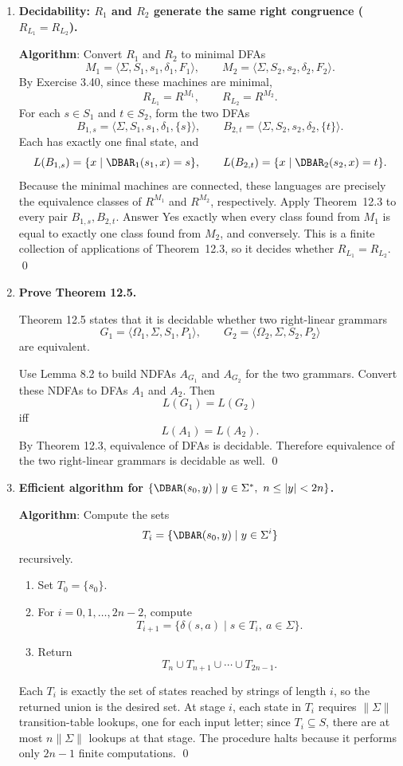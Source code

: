 \begin{enumerate}[{12.}1. ]
\item \textbf{Decidability: $R_1$ and $R_2$ generate the same right congruence ($R_{L_1}=R_{L_2}$).}

\textbf{Algorithm}: Convert $R_1$ and $R_2$ to minimal DFAs
\[
M_1=\langle\Sigma,S_1,s_1,\delta_1,F_1\rangle,\qquad
M_2=\langle\Sigma,S_2,s_2,\delta_2,F_2\rangle.
\]
By Exercise 3.40, since these machines are minimal,
\[
R_{L_1}=R^{M_1},\qquad R_{L_2}=R^{M_2}.
\]
For each $s\in S_1$ and $t\in S_2$, form the two DFAs
\[
B_{1,s}=\langle\Sigma,S_1,s_1,\delta_1,\{s\}\rangle,
\qquad
B_{2,t}=\langle\Sigma,S_2,s_2,\delta_2,\{t\}\rangle.
\]
Each has exactly one final state, and
\[
L(B_{1,s})=\{x\mid\DBAR_1(s_1,x)=s\},
\qquad
L(B_{2,t})=\{x\mid\DBAR_2(s_2,x)=t\}.
\]
Because the minimal machines are connected, these languages are precisely the
equivalence classes of $R^{M_1}$ and $R^{M_2}$, respectively. Apply
Theorem~12.3 to every pair $B_{1,s},B_{2,t}$. Answer Yes exactly when
every class found from $M_1$ is equal to exactly one class found from $M_2$, and
conversely. This is a finite collection of applications of Theorem~12.3, so it
decides whether $R_{L_1}=R_{L_2}$. \qed

\item \textbf{Prove Theorem 12.5.}

Theorem 12.5 states that it is decidable whether two right-linear grammars
\[
G_1=\langle\Omega_1,\Sigma,S_1,P_1\rangle,\qquad
G_2=\langle\Omega_2,\Sigma,S_2,P_2\rangle
\]
are equivalent.

Use Lemma 8.2 to build NDFAs $A_{G_1}$ and $A_{G_2}$ for the two grammars.
Convert these NDFAs to DFAs $A_1$ and $A_2$. Then
\[
L(G_1)=L(G_2)
\]
iff
\[
L(A_1)=L(A_2).
\]
By Theorem 12.3, equivalence of DFAs is decidable. Therefore equivalence of the
two right-linear grammars is decidable as well. \qed

\item \textbf{Efficient algorithm for $\{\DBAR(s_0,y)\mid y\in\Sigma^*,\ n\leq|y|<2n\}$.}

\textbf{Algorithm}: Compute the sets
\[
T_i=\{\DBAR(s_0,y)\mid y\in\Sigma^i\}
\]
recursively.
\begin{enumerate}
\item Set $T_0=\{s_0\}$.
\item For $i=0,1,\ldots,2n-2$, compute
\[
T_{i+1}=\{\delta(s,a)\mid s\in T_i,\ a\in\Sigma\}.
\]
\item Return
\[
T_n\cup T_{n+1}\cup\cdots\cup T_{2n-1}.
\]
\end{enumerate}
Each $T_i$ is exactly the set of states reached by strings of length $i$, so the
returned union is the desired set. At stage $i$, each state in $T_i$ requires
$\|\Sigma\|$ transition-table lookups, one for each input letter; since
$T_i\subseteq S$, there are at most $n\|\Sigma\|$ lookups at that stage. The
procedure halts because it performs only $2n-1$ finite computations. \qed


\end{enumerate}
